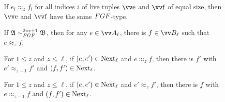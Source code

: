 \begin{description}
  \item[] If $e_{i} \approx_{z} f_{i}$ for all indices $i$ of live tuples $\elemtuptuplee$ and $\elemtuptuplef$ of equal size, then $\elemtuptuplee$ and $\elemtuptuplef$ have the same $\FGF$-type.
  \item[] If $\str{A} \bisimto_{\FGF}^{2*z + 1} \str{B}$, then for any $e \in \unraveldom{A}_{\ell}$, there is $f \in \unraveldom{B}_{\ell}$ such that $e \approx_{z} f$.
  \item[] For $1 \le z$ and $z \le \ell$, if $(e, e') \in \mathrm{Next}_{\ell}$ and $e \approx_{z} f$, then there is $f'$ with $e' \approx_{z-1} f'$ and $(f, f') \in \mathrm{Next}_{\ell}$.
  \item[] For $1 \le z$ and $z \le \ell$, if $(e, e') \in \mathrm{Next}_{\ell}$ and $e' \approx_{z} f'$, then there is $f$ with $e \approx_{z-1} f$ and $(f, f') \in \mathrm{Next}_{\ell}$.
\end{description}

